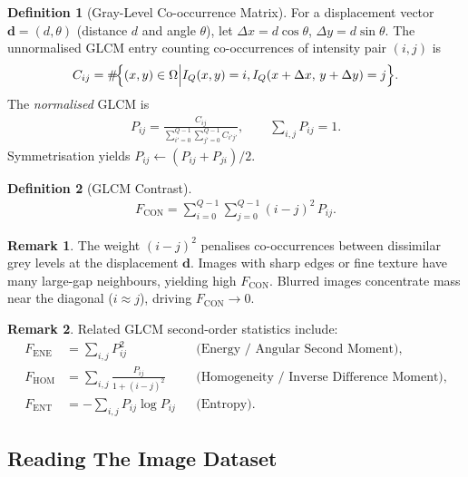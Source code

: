 \documentclass[12pt, xcolor=dvipsnames,svgnames,x11names]{article}
\theoremstyle{definition}
\newtheorem{definition}{Definition}[section]
\newtheorem{remark}{Remark}[section]
\begin{document}
\begin{definition}[Gray-Level Co-occurrence Matrix]
For a displacement vector $\mathbf{d}=(d,\theta)$ (distance $d$ and angle
$\theta$), let $\Delta x = d\cos\theta$, $\Delta y = d\sin\theta$.  The
unnormalised GLCM entry counting co-occurrences of intensity pair $(i,j)$ is
\begin{align*}
  C_{ij} =
  \#\!\Bigl\{(x,y) \in \Omega \Big|
  I_Q(x,y)=i, I_Q(x+\Delta x,\, y+\Delta y)=j\Bigr\}.
\end{align*}
The \emph{normalised} GLCM is
\begin{align*}
  P_{ij} = \frac{C_{ij}}{\displaystyle\sum_{i'=0}^{Q-1}\sum_{j'=0}^{Q-1}C_{i'j'}},
  \qquad \sum_{i,j} P_{ij} = 1.
\end{align*}
Symmetrisation yields $P_{ij} \leftarrow (P_{ij}+P_{ji})/2$.
\end{definition}

\begin{definition}[GLCM Contrast]
\begin{align*}
  \boxed{F_{\mathrm{CON}} =
    \sum_{i=0}^{Q-1}\sum_{j=0}^{Q-1}
    (i-j)^2\, P_{ij}.}
\end{align*}
\end{definition}

\begin{remark}
The weight $(i-j)^2$ penalises co-occurrences between dissimilar grey levels
at the displacement $\mathbf{d}$.  Images with sharp edges or fine texture
have many large-gap neighbours, yielding high $F_{\mathrm{CON}}$.  Blurred
images concentrate mass near the diagonal ($i \approx j$), driving
$F_{\mathrm{CON}} \to 0$.
\end{remark}

\begin{remark}
Related GLCM second-order statistics include:
\begin{align*}
  F_{\mathrm{ENE}} &= \sum_{i,j} P_{ij}^2
    & &\text{(Energy / Angular Second Moment)},\\
  F_{\mathrm{HOM}} &= \sum_{i,j}\frac{P_{ij}}{1+(i-j)^2}
    & &\text{(Homogeneity / Inverse Difference Moment)},\\
  F_{\mathrm{ENT}} &= -\sum_{i,j} P_{ij}\log P_{ij}
    & &\text{(Entropy)}.
\end{align*}
\end{remark}


\subsection{Reading The Image Dataset}
\end{document}
